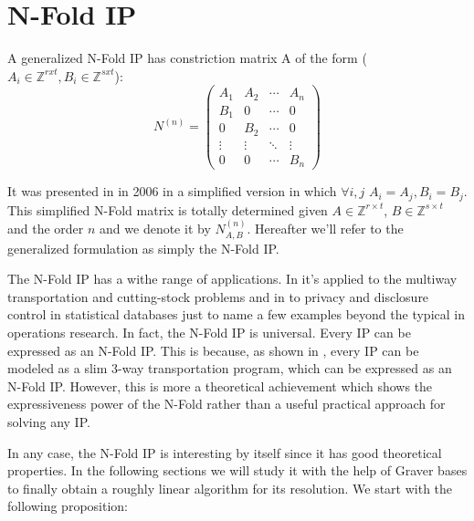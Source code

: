 \chapter{N-Fold IP} \label{methodology}



A generalized N-Fold IP has constriction matrix A of the form ($A_i \in \mathbb{Z}^{rxt}, B_i \in \mathbb{Z}^{sxt}$):\\
\begin{equation*}
N^{(n)} = 
\begin{pmatrix}
A_1 & A_2 & \cdots & A_n \\
B_1 & 0   & \cdots & 0 \\
0   & B_2 & \cdots & 0 \\
\vdots    & \vdots & \ddots & \vdots  \\
0   & 0   & \cdots & B_n 
\end{pmatrix}
\end{equation*}


It was presented in \cite{LHOW:2006} in 2006 in a simplified version in which $\forall i,j$  $A_i = A_j, B_i = B_j$. This simplified N-Fold matrix is totally determined given $A \in \mathbb{Z}^{r \times t}$, $B \in \mathbb{Z}^{s \times t}$ and the order $n$ and we denote it by $N_{A,B}^{(n)}$. Hereafter we'll refer to the generalized formulation as simply the N-Fold IP. 

The N-Fold IP has a withe range of applications. In \cite{LHOW:2006} it's applied to the multiway transportation and cutting-stock problems and in \cite{HEMMECKE:2011} to privacy and disclosure control in
statistical databases just to name a few examples beyond the typical in operations research. In fact, the N-Fold IP is universal. Every IP can be expressed as an N-Fold IP. This is because, as shown in \cite{LO:2006}, every IP can be modeled as a slim 3-way transportation program, which can be expressed as an N-Fold IP. However, this is more a theoretical achievement which shows the expressiveness power of the N-Fold rather than a useful practical approach for solving any IP. 

In any case, the N-Fold IP is interesting by itself since it has good theoretical properties. In the following sections we will study it with the help of Graver bases to finally obtain a roughly linear algorithm for its resolution. We start with the following proposition:

